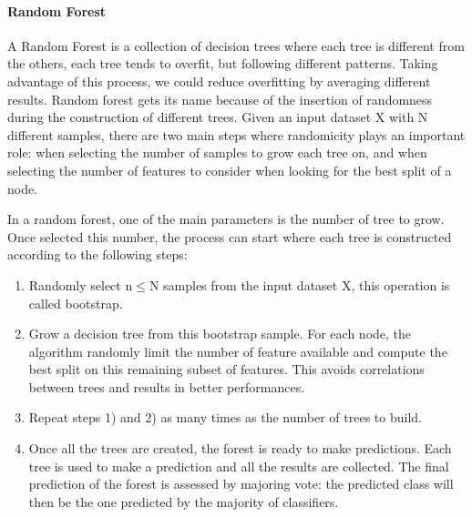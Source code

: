 \documentclass[11pt]{report}
\begin{document}
\paragraph{Random Forest} \hfill

A Random Forest is a collection of decision trees where each tree is different from the others, each tree tends to overfit, but following different patterns.
Taking advantage of this process, we could reduce overfitting by averaging different results.
Random forest gets its name because of the insertion of randomness during the construction of different trees.
Given an input dataset X with N different samples, there are two main steps where randomicity plays an important role: when selecting the number of samples to grow each tree on, and when selecting the number of features to consider when looking for the best split of a node.

In a random forest, one of the main parameters is the number of tree to grow.
Once selected this number, the process can start where each tree is constructed according to the following steps:
\begin{enumerate}
\item Randomly select n$\leq$N samples from the input dataset X, this operation is called bootstrap.
\item Grow a decision tree from this bootstrap sample. For each node, the algorithm randomly limit the number of feature available and compute the best split on this remaining subset of features. This avoids correlations between trees and results in better performances.
\item Repeat steps 1) and 2) as many times as the number of trees to build.
\item Once all the trees are created, the forest is ready to make predictions. Each tree is used to make a prediction and all the results are collected.
The final prediction of the forest is assessed by majoring vote: the predicted class will then be the one predicted by the majority of classifiers.
\end{enumerate}


\end{document}
